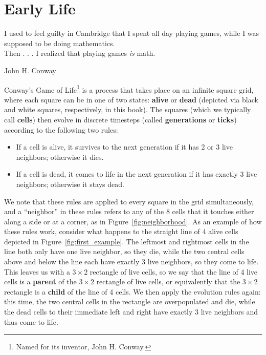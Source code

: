 
\renewcommand{\chapterfolder}{early_life/}
\chapter{Early Life}


\vspace*{-0.4in}
\epigraph{I used to feel guilty in Cambridge that I spent all day playing games, while I was supposed to be doing mathematics. \\ Then . . . I realized that playing games \emph{is} math.}{John H. Conway}
\vspace*{0.4in}


\noindent Conway's Game of Life\footnote{Named for its inventor, John H. Conway.} is a process that takes place on an infinite square grid, where each square can be in one of two states: \textbf{alive} or \textbf{dead} (depicted via black and white squares, respectively, in this book). The squares (which we typically call \textbf{cells}) then evolve in discrete timesteps (called \textbf{generations} or \textbf{ticks}) according to the following two rules:\smallskip

\begin{itemize}
	\item If a cell is alive, it survives to the next generation if it has 2 or 3 live neighbors; otherwise it dies.\smallskip
	
	\item If a cell is dead, it comes to life in the next generation if it has exactly 3 live neighbors; otherwise it stays dead.\smallskip
\end{itemize}

We note that these rules are applied to every square in the grid simultaneously, and a ``neighbor'' in these rules refers to any of the 8 cells that it touches either along a side or at a corner, as in Figure~\ref{fig:neighborhood}. As an example of how these rules work, consider what happens to the straight line of 4 alive cells depicted in Figure~\ref{fig:first_example}. The leftmost and rightmost cells in the line both only have one live neighbor, so they die, while the two central cells above and below the line each have exactly 3 live neighbors, so they come to life. This leaves us with a $3 \times 2$ rectangle of live cells, so we say that the line of 4 live cells is a \textbf{parent} of the $3 \times 2$ rectangle of live cells, or equivalently that the $3 \times 2$ rectangle is a \textbf{child} of the line of 4 cells. We then apply the evolution rules again: this time, the two central cells in the rectangle are overpopulated and die, while the dead cells to their immediate left and right have exactly 3 live neighbors and thus come to life.

